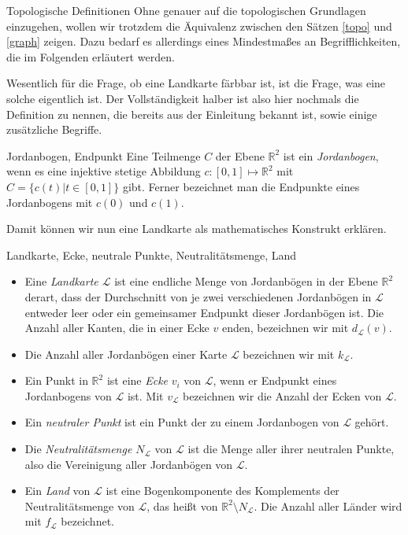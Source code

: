 \begin{section}{Topologische Definitionen}
 Ohne genauer auf die topologischen Grundlagen einzugehen, wollen wir trotzdem die Äquivalenz zwischen den Sätzen \ref{topo} und \ref{graph} zeigen. Dazu bedarf es allerdings eines Mindestmaßes an Begrifflichkeiten, die im Folgenden erläutert werden.
 
 Wesentlich für die Frage, ob eine Landkarte färbbar ist, ist die Frage, was eine solche eigentlich ist. Der Vollständigkeit halber ist also hier nochmals die Definition zu nennen, die bereits aus der Einleitung bekannt ist, sowie einige zusätzliche Begriffe.
 
 \begin{definition}{Jordanbogen, Endpunkt}
  Eine Teilmenge $C$ der Ebene $\mathbb{R}^2$ ist ein \textit{Jordanbogen}, wenn es eine injektive stetige Abbildung $c:[0,1] \mapsto \mathbb{R}^2$ mit $C = \{c(t)|t\in [0,1]\}$ gibt. Ferner bezeichnet man die Endpunkte eines Jordanbogens mit $c(0)$ und $c(1)$.
 \end{definition}
 
 Damit können wir nun eine Landkarte als mathematisches Konstrukt erklären.
 
 \begin{definition}{Landkarte, Ecke, neutrale Punkte, Neutralitätsmenge, Land}
  \-\ 
  \begin{itemize}
    \item Eine \textit{Landkarte $\mathcal{L}$} ist eine endliche Menge von Jordanbögen in der Ebene $\mathbb{R}^2$ derart, dass der Durchschnitt von je zwei verschiedenen Jordanbögen in $\mathcal{L}$ entweder leer oder ein gemeinsamer Endpunkt dieser Jordanbögen ist. Die Anzahl aller Kanten, die in einer Ecke $v$ enden, bezeichnen wir mit $d_\mathcal{L}(v)$.
    \item Die Anzahl aller Jordanbögen einer Karte $\mathcal{L}$ bezeichnen wir mit $k_\mathcal{L}$.
    \item Ein Punkt in $\mathbb{R}^2$ ist eine \textit{Ecke} $v_i$ von $\mathcal{L}$, wenn er Endpunkt eines Jordanbogens von $\mathcal{L}$ ist. Mit $v_\mathcal{L}$ bezeichnen wir die Anzahl der Ecken von $\mathcal{L}$.
    \item Ein \textit{neutraler Punkt} ist ein Punkt der zu einem Jordanbogen von $\mathcal{L}$ gehört.
    \item Die \textit{Neutralitätsmenge $N_{\mathcal{L}}$} von $\mathcal{L}$ ist die Menge aller ihrer neutralen Punkte, also die Vereinigung aller Jordanbögen von $\mathcal{L}$. 
    \item Ein \textit{Land} von $\mathcal{L}$ ist eine Bogenkomponente des Komplements der Neutralitätsmenge von $\mathcal{L}$, das heißt von $\mathbb{R}^2 \setminus N_{\mathcal{L}}$. Die Anzahl aller Länder wird mit $f_\mathcal{L}$ bezeichnet.
  \end{itemize}
 \end{definition}
 

\end{section}
